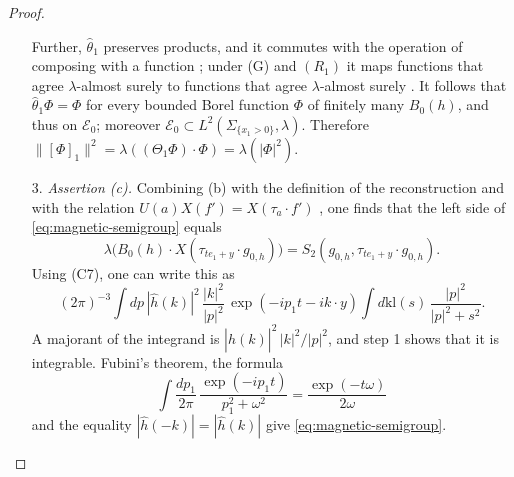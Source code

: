 \documentclass[11pt,letterpaper,reqno]{amsart}
\theoremstyle{definition}
\begin{document}
\begin{proof}
\begin{enumerate}
Further, $\hat\theta_1$ preserves products, and it commutes with the operation of composing with a function \cite[Section~8.1.2]{QEDI}; under (G) and $(R_1)$ it maps functions that agree $\lambda$-almost surely to functions that agree $\lambda$-almost surely \cite[Section~14.1, after Lemma~14.3]{QEDII}.
It follows that $\hat\theta_1\Phi=\Phi$ for every bounded Borel function $\Phi$ of finitely many $B_0(h)$, and thus on $\mathcal E_0$; moreover $\mathcal E_0\subset L^2(\Sigma_{\{x_1>0\}},\lambda)$.
Therefore $\|[\Phi]_1\|^2=\allowbreak \lambda((\Theta_1\Phi)\cdot\Phi)=\allowbreak \lambda(|\Phi|^2)$.
\item[3.] \emph{Assertion (c).}
Combining (b) with the definition of the reconstruction and with the relation $U(a)X(f')=X(\tau_a\cdot f')$ \cite[Lemma~14.3\,(a)]{QEDII}, one finds that the left side of \eqref{eq:magnetic-semigroup} equals
\begin{equation*}
\lambda\bigl(B_0(h)\cdot X(\tau_{te_1+y}\cdot g_{0,h})\bigr)=S_2(g_{0,h},\tau_{te_1+y}\cdot g_{0,h}).
\end{equation*}
Using (C7), one can write this as
\begin{equation*}
(2\pi)^{-3}\int dp\,|\hat h(k)|^2\,\frac{|k|^2}{|p|^2}\,\exp(-ip_1t-ik\cdot y)\int d\mathrm{kl}(s)\,\frac{|p|^2}{|p|^2+s^2}.
\end{equation*}
A majorant of the integrand is $|\hat h(k)|^2\,|k|^2/|p|^2$, and step 1 shows that it is integrable.
Fubini's theorem, the formula
\begin{equation*}
\int\frac{dp_1}{2\pi}\,\frac{\exp(-ip_1t)}{p_1^2+\omega^2}=\frac{\exp(-t\omega)}{2\omega}
\end{equation*}
and the equality $|\hat h(-k)|=|\hat h(k)|$ give \eqref{eq:magnetic-semigroup}.


\end{enumerate}
\end{proof}
\end{document}
